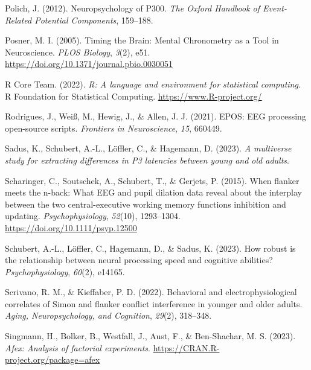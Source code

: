 \documentclass[
  man]{apa7}
\newlength{\cslhangindent}
\newlength{\cslentryspacingunit} %
\newenvironment{CSLReferences}[2] %
 {%
  \setlength{\parindent}{0pt}
  \ifodd #1
  \let\oldpar\par
  \def\par{\hangindent=\cslhangindent\oldpar}
  \fi
  \setlength{\parskip}{#2\cslentryspacingunit}
 }%
 {}
\begin{document}
\begin{CSLReferences}{1}{0}
\leavevmode{}%
Polich, J. (2012). Neuropsychology of {P300}. \emph{The Oxford Handbook of Event-Related Potential Components}, 159--188.

\leavevmode{}%
Posner, M. I. (2005). Timing the {Brain}: {Mental} {Chronometry} as a {Tool} in {Neuroscience}. \emph{PLOS Biology}, \emph{3}(2), e51. \url{https://doi.org/10.1371/journal.pbio.0030051}

\leavevmode{}%
R Core Team. (2022). \emph{R: A language and environment for statistical computing}. R Foundation for Statistical Computing. \url{https://www.R-project.org/}

\leavevmode{}%
Rodrigues, J., Weiß, M., Hewig, J., \& Allen, J. J. (2021). {EPOS}: {EEG} processing open-source scripts. \emph{Frontiers in Neuroscience}, \emph{15}, 660449.

\leavevmode{}%
Sadus, K., Schubert, A.-L., Löffler, C., \& Hagemann, D. (2023). \emph{A multiverse study for extracting differences in {P3} latencies between young and old adults}.

\leavevmode{}%
Scharinger, C., Soutschek, A., Schubert, T., \& Gerjets, P. (2015). When flanker meets the n-back: {What} {EEG} and pupil dilation data reveal about the interplay between the two central-executive working memory functions inhibition and updating. \emph{Psychophysiology}, \emph{52}(10), 1293--1304. \url{https://doi.org/10.1111/psyp.12500}

\leavevmode{}%
Schubert, A.-L., Löffler, C., Hagemann, D., \& Sadus, K. (2023). How robust is the relationship between neural processing speed and cognitive abilities? \emph{Psychophysiology}, \emph{60}(2), e14165.

\leavevmode{}%
Scrivano, R. M., \& Kieffaber, P. D. (2022). Behavioral and electrophysiological correlates of {Simon} and flanker conflict interference in younger and older adults. \emph{Aging, Neuropsychology, and Cognition}, \emph{29}(2), 318--348.

\leavevmode{}%
Singmann, H., Bolker, B., Westfall, J., Aust, F., \& Ben-Shachar, M. S. (2023). \emph{Afex: Analysis of factorial experiments}. \url{https://CRAN.R-project.org/package=afex}


\end{CSLReferences}
\end{document}

